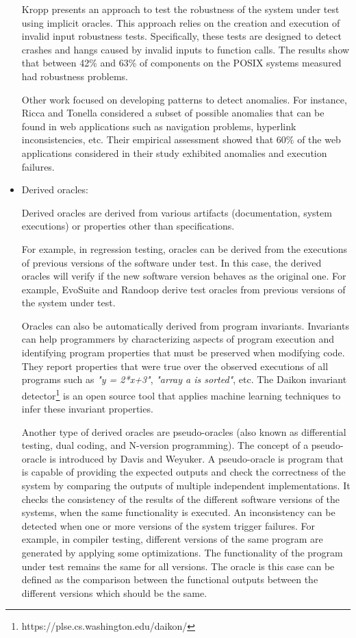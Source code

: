 \begin{itemize}
	Kropp \etal\cite{kropp1998automated} presents an approach to test the robustness of the system under test using implicit oracles.
	This approach relies on the creation and execution of invalid input robustness tests. Specifically, these tests are designed to detect crashes and hangs caused by invalid inputs to function calls. The results show that between 42\% and 63\% of components on the POSIX systems measured had robustness problems. 
	
	Other work  focused on developing patterns to detect anomalies. For instance, Ricca and Tonella\cite{ricca2006detecting} considered a subset of possible anomalies that can be found in web applications such as navigation problems, hyperlink inconsistencies, etc. Their empirical assessment
	showed that 60\% of the web applications considered in their study exhibited anomalies and execution failures.
	
	
	\item Derived oracles:
	
	Derived oracles are derived from various artifacts (\eg documentation, system executions) or properties other than specifications.
	
	For example, in regression testing, oracles can be derived from the executions of previous versions of the software under test. In this case, the derived oracles will verify if the new software version behaves as the original one\cite{mariani2007compatibility}. For example, EvoSuite and Randoop derive test oracles from previous versions of the system under test.
	
	Oracles can also be automatically derived from program invariants\cite{ernst2000quickly}. Invariants can help programmers by characterizing aspects of program execution and identifying program properties that must be preserved when modifying code. They report properties that were true over the observed executions of all programs such as \textit{"y = 2*x+3"}, \textit{"array a is sorted"}, etc. The Daikon invariant detector\footnote{https://plse.cs.washington.edu/daikon/} is an open source tool that applies machine learning techniques to infer these invariant properties.
	
	Another type of derived oracles are pseudo-oracles (also known as differential testing, dual coding, and N-version programming\cite{patrick2016testing}). 
	The concept of a pseudo-oracle is introduced by Davis and Weyuker\cite{davis1981pseudo}.
	A pseudo-oracle is program that is capable of providing the expected outputs and check the correctness of the system by comparing the outputs of multiple independent implementations. 
	It checks the consistency of the results of the different software versions of the systems, when the same functionality is executed. An inconsistency can be detected when one or more versions of the system trigger failures. 
	For example, in compiler testing, different versions of the same program are generated by applying some optimizations. The functionality of the program under test remains the same for all versions. The oracle is this case can be defined as the comparison between the functional outputs between the different versions which should be the same\cite{yang2011finding}.
	

\end{itemize}
